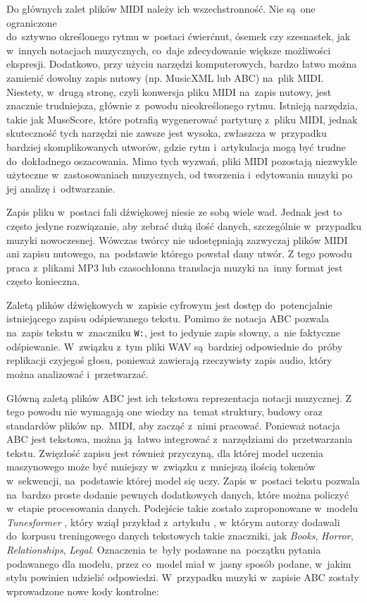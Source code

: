 \documentclass[data-science]{agh-wi} %
\begin{document}
Do głównych zalet plików MIDI należy ich wszechstronność. Nie są~one ograniczone \\do~sztywno określonego rytmu w~postaci ćwierćnut, ósemek czy szesnastek, jak w~innych notacjach muzycznych, co~daje zdecydowanie większe możliwości ekspresji. Dodatkowo, przy użyciu narzędzi komputerowych, bardzo łatwo można zamienić dowolny zapis nutowy (np. MusicXML lub ABC) na~plik MIDI. Niestety, w~drugą stronę, czyli konwersja pliku MIDI na~zapis nutowy, jest znacznie trudniejsza, głównie z~powodu nieokreślonego rytmu. Istnieją narzędzia, takie jak MuseScore, które potrafią wygenerować partyturę z~pliku MIDI, jednak skuteczność tych narzędzi nie zawsze jest wysoka, zwłaszcza w~przypadku bardziej skomplikowanych utworów, gdzie rytm i~artykulacja mogą być trudne do~dokładnego oszacowania. Mimo tych wyzwań, pliki MIDI pozostają niezwykle użyteczne w~zastosowaniach muzycznych, od tworzenia i~edytowania muzyki po jej analizę i~odtwarzanie.

Zapis pliku w~postaci fali dźwiękowej niesie ze sobą wiele wad. Jednak jest to często jedyne rozwiązanie, aby zebrać dużą ilość danych, szczególnie w~przypadku muzyki nowoczesnej. Wówczas twórcy nie udostępniają zazwyczaj plików MIDI ani zapisu nutowego, na~podstawie którego powstał dany utwór. Z tego powodu praca z~plikami MP3 lub czasochłonna translacja muzyki na~inny format jest często konieczna.

Zaletą plików dźwiękowych w~zapisie cyfrowym jest dostęp do~potencjalnie istniejącego zapisu odśpiewanego tekstu. Pomimo że notacja ABC pozwala na~zapis tekstu w~znaczniku \texttt{W:}, jest to jedynie zapis słowny, a~nie faktyczne odśpiewanie. W~związku z~tym pliki WAV są~bardziej odpowiednie do~próby replikacji czyjegoś głosu, ponieważ zawierają rzeczywisty zapis audio, który można analizować i~przetwarzać.

Główną zaletą plików ABC jest ich tekstowa reprezentacja notacji muzycznej. Z tego powodu nie wymagają one wiedzy na~temat struktury, budowy oraz standardów plików np.~MIDI, aby zacząć z~nimi pracować. Ponieważ notacja ABC jest tekstowa, można ją~łatwo integrować z~narzędziami do~przetwarzania tekstu. Zwięzłość zapisu jest również przyczyną, dla której model uczenia maszynowego może być mniejszy w~związku z~mniejszą ilością tokenów w~sekwencji, na~podstawie której model się uczy. Zapis w~postaci tekstu pozwala na~bardzo proste dodanie pewnych dodatkowych danych, które można policzyć w~etapie procesowania danych. Podejście takie zostało zaproponowane w~modelu \textit{Tunesformer} \cite{tunesformer}, który wziął przykład z~artykułu \cite{keskarCTRL2019}, w~którym autorzy dodawali do~korpusu treningowego danych tekstowych takie znaczniki, jak \textit{Books}, \textit{Horror}, \textit{Relationships}, \textit{Legal}. Oznaczenia te~były podawane na~początku pytania podawanego dla modelu, przez co~model miał w~jasny sposób podane, w~jakim stylu powinien udzielić odpowiedzi. W~przypadku muzyki w~zapisie ABC zostały wprowadzone nowe kody kontrolne:
\end{document}
